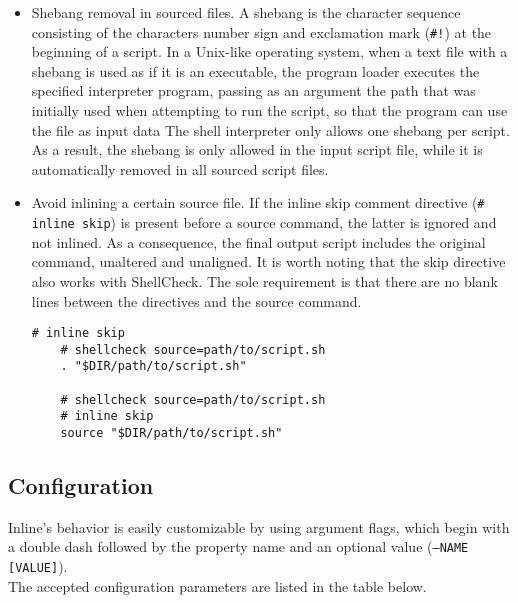 \begin{itemize}
  \item Shebang removal in sourced files.
    \newline
    A shebang is the character sequence consisting of the characters number sign
    and exclamation mark (\texttt{\#!}) at the beginning of a script. In a Unix-like
    operating system, when a text file with a shebang is used as if it is an
    executable, the program loader executes the specified interpreter program,
    passing as an argument the path that was initially used when attempting to
    run the script, so that the program can use the file as input data\cite{shebang}
    \newline
    The shell interpreter only allows one shebang per script. As a result, the
    shebang is only allowed in the input script file, while it is automatically removed
    in all sourced script files.

  \item Avoid inlining a certain source file. If the inline skip comment
    directive (\texttt{\# inline skip}) is present before a source command, the
    latter is ignored and not inlined. As a consequence, the final output script
    includes the original command, unaltered and unaligned.
    \newline
    It is worth noting that the skip directive also works with ShellCheck. The sole
    requirement is that there are no blank lines between the directives and the source
    command.
    \newline
    \begin{lstlisting}[language=shell, alsoletter={.}, morekeywords={[2]{.}}, numbers=none, aboveskip=0pt, belowskip=0pt, abovecaptionskip=0pt, belowcaptionskip=0pt]
    # inline skip
    # shellcheck source=path/to/script.sh
    . "$DIR/path/to/script.sh"

    # shellcheck source=path/to/script.sh
    # inline skip
    source "$DIR/path/to/script.sh"
  \end{lstlisting}
\end{itemize}

\subsection{Configuration}
\label{subsec:corollary_projects_inline_configuration}

Inline's behavior is easily customizable by using argument flags, which begin with
a double dash followed by the property name and an optional value (\texttt{--NAME
[VALUE]}). \\ %
The accepted configuration parameters are listed in the table below.

